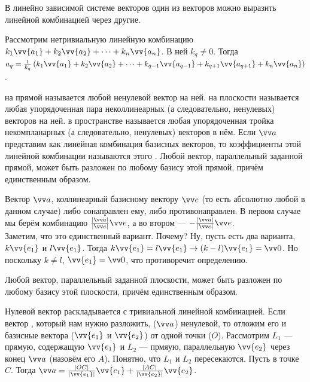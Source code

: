 \documentclass{article}
\let\vec\vv
\begin{document}
\begin{itemize}
\begin{Proof}
        \end{Proof}
        \thm В линейно зависимой системе векторов один из векторов можно выразить линейной комбинацией через другие.
        \begin{Proof}
            Рассмотрим нетривиальную линейную комбинацию $k_1\vec{a_1}+k_2\vec{a_2}+\cdots+k_n\vec{a_n}$. В ней $k_q\neq0$. Тогда $a_q=\frac1{k_q}\left(k_1\vec{a_1}+k_2\vec{a_2}+\cdots+k_{q-1}\vec{a_{q-1}}+k_{q+1}\vec{a_{q+1}}+k_n\vec{a_n}\right)$.
        \end{Proof}
        \dfn{} на прямой называется любой ненулевой вектор на ней.
        \dfn{} на плоскости называется любая упорядоченная пара неколлинеарных (а следовательно, ненулевых) векторов на ней.
        \dfn{} в пространстве называется любая упорядоченная тройка некомпланарных (а следовательно, ненулевых) векторов в нём.
        \dfn Если $\vec a$ представим как линейная комбинация базисных векторов, то коэффициенты этой линейной комбинации называются  этого .
        \thm Любой вектор, параллельный заданной прямой, может быть разложен по любому базису этой прямой, причём единственным образом.
        \begin{Proof}
            Вектор $\vec a$, коллинеарный базисному вектору $\vec e$ (то есть абсолютно любой в данном случае) либо сонаправлен ему, либо противонаправлен. В первом случае мы берём комбинацию $\frac{|\vec a|}{|\vec e|}\vec e$, а во втором --- $-\frac{|\vec a|}{|\vec e|}\vec e$.\\
            Заметим, что это единственный вариант. Почему? Ну, пусть есть два варианта, $k\vec{e_1}$ и $l\vec{e_1}$. Тогда $k\vec{e_1}=l\vec{e_1}\rightarrow(k-l)\vec{e_1}=\vec0$. Но поскольку $k\neq l$, $\vec{e_1}=\vec0$, что противоречит определению.
        \end{Proof}
        \thm Любой вектор, параллельный заданной плоскости, может быть разложен по любому базису этой плоскости, причём единственным образом.
        \begin{Proof}
            Нулевой вектор раскладывается с тривиальной линейной комбинацией.
            Если вектор , который нам нужно разложить, ($\vec a$) ненулевой, то отложим его и базисные вектора ($\vec{e_1}$ и $\vec{e_2}$) от одной точки ($O$). Рассмотрим $L_1$ --- прямую, содержащую $\vec{e_1}$ и $L_2$ --- прмяую, параллельную $\vec{e_2}$ через конец $\vec a$ (назовём его $A$). Понятно, что $L_1$ и $L_2$ пересекаются. Пусть в точке $C$. Тогда $\vec a=\frac{|OC|}{|\vec{e_1}|}\vec{e_1}+\frac{|AC|}{|\vec{e_2}|}\vec{e_2}$.\\

\end{Proof}
\end{itemize}
\end{document}
